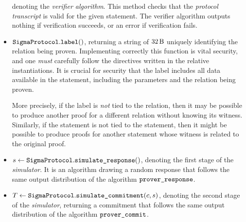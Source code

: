 \documentclass[11pt]{article}
\begin{document}
\begin{itemize}
          denoting the \emph{verifier algorithm}. This method checks that
          the \emph{protocol transcript} is valid for the given statement.
          The verifier algorithm outputs nothing if verification succeeds,
          or an error if verification fails.
          \item $\texttt{SigmaProtocol}.\texttt{label}()$,
          returning a string of $\seedlen$ uniquely identifying the relation being proven.
          Implementing correctly this function is vital security, and one \emph{must} carefully follow the directives written in the relative instantiations. It is crucial for security that the label includes all data available in the statement, including the parameters and the relation being proven.

          More precisely, if the label is \emph{not} tied to the relation, then it may be possible to produce another proof for a different relation without knowing its witness.
          Similarly, if the statement is not tied to the statement, then it might be possible to produce proofs
          for another statement whose witness is related to the original proof.

        \item $s \gets \texttt{SigmaProtocol}.\texttt{simulate\_response}()$,
        denoting the first stage of the \emph{simulator}. It is an algorithm drawing a random response that follows the same output distribution of the algorithm $\texttt{prover\_response}$.
        \item $T \gets \texttt{SigmaProtocol}.\texttt{simulate\_commitment}(c, s)$, denoting the second stage of the \emph{simulator}, returning a commitment that follows the same output distribution of the algorithm $\texttt{prover\_commit}$.
      \end{itemize}
\end{document}

